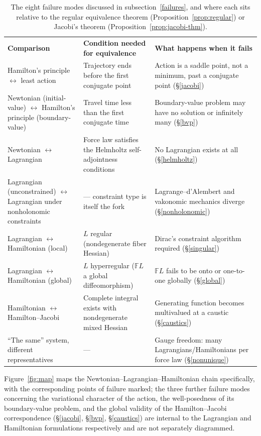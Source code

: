 \begin{table}[htbp]
\centering
\small
\begin{tabular}{@{}p{2.6cm}p{4.4cm}p{5.6cm}@{}}
\textbf{Comparison} & \textbf{Condition needed for equivalence} & \textbf{What happens when it fails} \\
Hamilton's principle $\leftrightarrow$ least action & Trajectory ends before
    the first conjugate point & Action is a saddle point, not a minimum, past a
    conjugate point (\S\ref{jacobi}) \\
Newtonian (initial-value) $\leftrightarrow$ Hamilton's principle
    (boundary-value) & Travel time less than the first conjugate time &
    Boundary-value problem may have no solution or infinitely many
    (\S\ref{bvp}) \\
Newtonian $\leftrightarrow$ Lagrangian & Force law satisfies the Helmholtz
    self-adjointness conditions & No Lagrangian exists at all
    (\S\ref{helmholtz}) \\
Lagrangian (unconstrained) $\leftrightarrow$ Lagrangian under nonholonomic
    constraints & --- constraint type is itself the fork & Lagrange--d'Alembert
    and vakonomic mechanics diverge (\S\ref{nonholonomic}) \\
Lagrangian $\leftrightarrow$ Hamiltonian (local) & $L$ regular (nondegenerate
    fiber Hessian) & Dirac's constraint algorithm required (\S\ref{singular})
    \\
Lagrangian $\leftrightarrow$ Hamiltonian (global) & $L$ hyperregular
    ($\mathbb{F}L$ a global diffeomorphism) & $\mathbb{F}L$ fails to be onto or
    one-to-one globally (\S\ref{global}) \\
Hamiltonian $\leftrightarrow$ Hamilton--Jacobi & Complete integral exists with
    nondegenerate mixed Hessian & Generating function becomes multivalued at a
    caustic (\S\ref{caustics}) \\
``The same'' system, different representatives & --- & Gauge freedom: many
    Lagrangians/Hamiltonians per force law (\S\ref{nonunique}) \\
\end{tabular}
\caption{The eight failure modes discussed in subsection~\ref{failures}, and
    where each sits relative to the regular equivalence theorem
    (Proposition~\ref{prop:regular}) or Jacobi's theorem
    (Proposition~\ref{prop:jacobi-thm}).}
\label{tab:summary}
\end{table}

Figure~\ref{fig:map} maps the Newtonian--Lagrangian--Hamiltonian chain
specifically, with the corresponding points of failure marked; the three
further failure modes concerning the variational character of the action, the
well-posedness of its boundary-value problem, and the global validity of the
Hamilton--Jacobi correspondence (\S\ref{jacobi}, \S\ref{bvp}, \S\ref{caustics})
are internal to the Lagrangian and Hamiltonian formulations respectively and
are not separately diagrammed.

